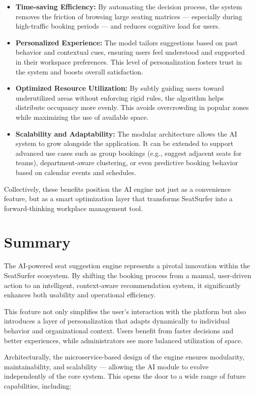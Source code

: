 \documentclass[12pt,a4paper]{report}
\begin{document}
\begin{itemize}
\item \textbf{Time-saving Efficiency:}
By automating the decision process, the system removes the friction of browsing large seating matrices — especially during high-traffic booking periods — and reduces cognitive load for users.
\item \textbf{Personalized Experience:}  
The model tailors suggestions based on past behavior and contextual cues, ensuring users feel understood and supported in their workspace preferences. This level of personalization fosters trust in the system and boosts overall satisfaction.
\item \textbf{Optimized Resource Utilization:}  
By subtly guiding users toward underutilized areas without enforcing rigid rules, the algorithm helps distribute occupancy more evenly. This avoids overcrowding in popular zones while maximizing the use of available space.
\item \textbf{Scalability and Adaptability:}  
The modular architecture allows the AI system to grow alongside the application. It can be extended to support advanced use cases such as group bookings (e.g., suggest adjacent seats for teams), department-aware clustering, or even predictive booking behavior based on calendar events and schedules.
\end{itemize}

Collectively, these benefits position the AI engine not just as a convenience feature, but as a smart optimization layer that transforms SeatSurfer into a forward-thinking workplace management tool.

\section{Summary}

The AI-powered seat suggestion engine represents a pivotal innovation within the SeatSurfer ecosystem. By shifting the booking process from a manual, user-driven action to an intelligent, context-aware recommendation system, it significantly enhances both usability and operational efficiency.

This feature not only simplifies the user's interaction with the platform but also introduces a layer of personalization that adapts dynamically to individual behavior and organizational context. Users benefit from faster decisions and better experiences, while administrators see more balanced utilization of space.

Architecturally, the microservice-based design of the engine ensures modularity, maintainability, and scalability — allowing the AI module to evolve independently of the core system. This opens the door to a wide range of future capabilities, including:
\end{document}
